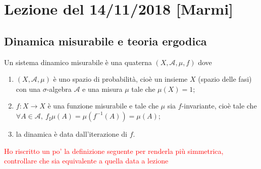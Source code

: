 \section{Lezione del 14/11/2018 [Marmi]}

\subsection{Dinamica misurabile e teoria ergodica}

\begin{definition}
    Un sistema dinamico misurabile è una quaterna $ (X, \mathcal{A}, \mu, f) $ dove
    \begin{enumerate}[label=(\roman*)]
        \item $ (X, \mathcal{A}, \mu) $ è uno spazio di probabilità, cioè un insieme $ X $ (spazio delle fasi) con una $ \sigma $-algebra $ \mathcal{A} $ e una misura $ \mu $ tale che $ \mu(X) = 1 $;
        \item $ f \colon X \to X $ è una funzione misurabile e tale che $ \mu $ sia $ f $-invariante, cioè tale che $ \forall A \in \mathcal{A}, \ f_{\sharp}\mu (A) = \mu(f^{-1}(A)) = \mu(A) $;
        \item la dinamica è data dall'iterazione di $ f $.
    \end{enumerate}
\end{definition}

\textcolor{red}{Ho riscritto un po' la definizione seguente per renderla più simmetrica, controllare che sia equivalente a quella data a lezione}

